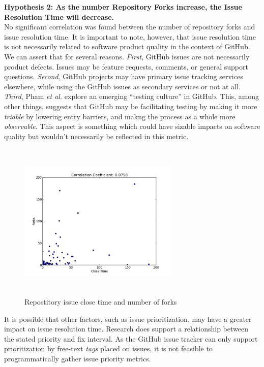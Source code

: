 \documentclass{proc}
\begin{document}
{{{{{{\noindent \textbf{Hypothesis 2: As the number Repository Forks increase, the Issue Resolution Time will decrease.}\\
No significant correlation was found between the number of repository forks and issue resolution time. It is important to note, however, that issue resolution time is not necessarily related to software product quality in the context of GitHub. We can assert that for several reasons. \textit{First}, GitHub issues are not necessarily product defects. Issues may be feature requests, comments, or general support questions. \textit{Second}, GitHub projects may have primary issue tracking services elsewhere, while using the GitHub issues as secondary services or not at all. \textit{Third}, Pham \textit{et al.} explore an emerging ``testing culture'' in GitHub. This, among other things, suggests that GitHub may be facilitating testing by making it more \emph{triable} by lowering entry barriers, and makng the process as a whole more \emph{observable}. This aspect is something which could have sizable impacts on software quality but wouldn't necessarily be reflected in this metric\cite{phamcreating}.

\begin{figure}
\includegraphics[height=3in,width=3in]{images/issue_close_time_forks_scatterplot.png}
\caption{Repostitory issue close time and number of forks}
\label{fig:issue_close_time_forks_scatterplot}
\end{figure}

It is possible that other factors, such as issue prioritization, may have a greater impact on issue resolution time. Research does support a relationship\cite{mockus2002two} between the stated priority and fix interval. As the GitHub issue tracker can only support prioritization by free-text \textit{tags} placed on issues, it is not feasible to programmatically gather issue priority metrics.\\

}}}}}}
\end{document}
